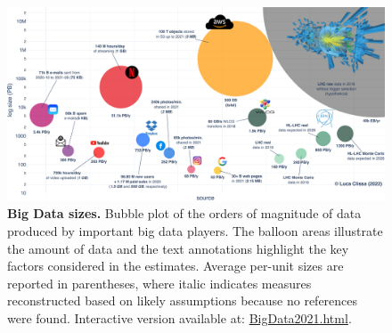 \begin{landscape}
\begin{figure}
    \centering
    \includegraphics[width=\linewidth]{figures/220_introduction/BigData2021.pdf}
    \caption{\textbf{Big Data sizes.} Bubble plot of the orders of magnitude of data produced by important big data players. The balloon areas illustrate the amount of data and the text annotations highlight the key factors considered in the estimates. Average per-unit sizes are reported in parentheses, where italic indicates measures reconstructed based on likely assumptions because no references were found. Interactive version available at: \href{https://clissa.github.io/BigData2021/BigData2021.html}{BigData2021.html}.}
    \label{fig:bigdata_size}
\end{figure}
\end{landscape}


